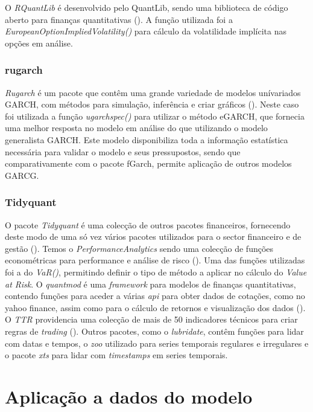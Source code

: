 \documentclass[
  12pt,
  a4paper,
  openany]{book}
\begin{document}
O \emph{RQuantLib} é desenvolvido pelo QuantLib, sendo uma biblioteca de código aberto para finanças quantitativas (\citet{RQuantLib}). A função utilizada foi a \emph{EuropeanOptionImpliedVolatility()} para cálculo da volatilidade implícita nas opções em análise.

\hypertarget{rugarch}{%
\subsection{rugarch}\label{rugarch}}

\emph{Rugarch} é um pacote que contêm uma grande variedade de modelos unívariados GARCH, com métodos para simulação, inferência e criar gráficos (\citet{rugarch}). Neste caso foi utilizada a função \emph{ugarchspec()} para utilizar o método eGARCH, que fornecia uma melhor resposta no modelo em análise do que utilizando o modelo generalista GARCH. Este modelo disponibiliza toda a informação estatística necessária para validar o modelo e seus pressupostos, sendo que comparativamente com o pacote fGarch, permite aplicação de outros modelos GARCG.

\hypertarget{tidyquant}{%
\subsection{Tidyquant}\label{tidyquant}}

O pacote \emph{Tidyquant} é uma colecção de outros pacotes financeiros, fornecendo deste modo de uma só vez vários pacotes utilizados para o sector financeiro e de gestão (\citet{tidyquant}). Temos o \emph{PerformanceAnalytics} sendo uma colecção de funções econométricas para performance e análise de risco (\citet{PerformanceAnalytics}). Uma das funções utilizadas foi a do \emph{VaR()}, permitindo definir o tipo de método a aplicar no cálculo do \emph{Value at Risk}. O \emph{quantmod} é uma \emph{framework} para modelos de finanças quantitativas, contendo funções para aceder a várias \emph{api} para obter dados de cotações, como no yahoo finance, assim como para o cálculo de retornos e visualização dos dados (\citet{quantmod}). O \emph{TTR} providencia uma colecção de mais de 50 indicadores técnicos para criar regras de \emph{trading} (\citet{TTR}). Outros pacotes, como o \emph{lubridate}, contêm funções para lidar com datas e tempos, o \emph{zoo} utilizado para series temporais regulares e irregulares e o pacote \emph{xts} para lidar com \emph{timestamps} em series temporais.

\hypertarget{aplicauxe7uxe3o-a-dados-do-modelo}{%
\chapter{Aplicação a dados do modelo}\label{aplicauxe7uxe3o-a-dados-do-modelo}}
\end{document}
